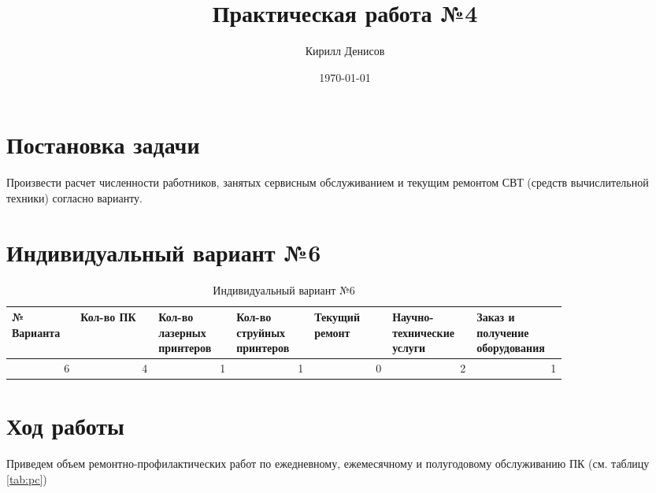 \documentclass[a4paper,14pt]{extarticle}
\author{Кирилл Денисов}
\title{Практическая работа №4}
\date{\today}
\newcommand{\pathToCommonFolder}{/home/denilai/Documents/repos/latex/Common}
\begin{document}
	\thispagestyle{empty}
	
	\newpage
	\newpage
	
	
	
	
\section*{Постановка задачи}

Произвести расчет численности работников, занятых
сервисным обслуживанием и текущим
ремонтом СВТ (средств вычислительной
техники) согласно варианту.




\section*{Индивидуальный вариант №6}

\begin{table}[htbp]
	
	\small
	\begin{tabular}{|p{0.1\linewidth}|p{0.12\linewidth}|p{0.12\linewidth}|p{0.12\linewidth}|p{0.12\linewidth}|p{0.12\linewidth}|p{0.12\linewidth}|}
		\hline
		№
		Варианта & Кол-во
		ПК & Кол-во
		лазерных
		принтеров & Кол-во
		струйных
		принтеров & Текущий ремонт & Научно-технические услуги & Заказ и получение оборудования \\ \hline
		\multicolumn{1}{|r|}{6} & \multicolumn{1}{r|}{4} & \multicolumn{1}{r|}{1} & \multicolumn{1}{r|}{1} & \multicolumn{1}{r|}{0} & \multicolumn{1}{r|}{2} & \multicolumn{1}{r|}{1} \\ \hline
	\end{tabular}
    \caption{Индивидуальный вариант №6}
	\label{}
\end{table}


\section*{Ход работы}

Приведем объем ремонтно-профилактических работ по ежедневному, ежемесячному и полугодовому обслуживанию ПК (см. таблицу \ref{tab:pc})
\end{document}

